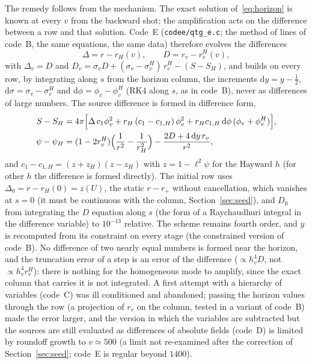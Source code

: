 \documentclass[11pt]{article}
\begin{document}
The remedy follows from the mechanism. The exact solution of~\eqref{eq:horizon} is known at every $v$ from the backward shot; the amplification acts on the difference between a row and that solution. Code~E (\texttt{codee/qtg\_e.c}; the method of lines of code~B, the same equations, the same data) therefore evolves the differences
\begin{equation}
\Delta=r-r_H(v),\qquad D=r_v-r_v^{H}(v),
\label{eq:vardiff}
\end{equation}
with $\Delta_v=D$ and $D_v=\sigma_vD+(\sigma_v-\sigma_v^{H})\,r_v^{H}-(S-S_H)$, and builds on every row, by integrating along $s$ from the horizon column, the increments $\mathrm{d}y=y-\tfrac12$, $\mathrm{d}\sigma=\sigma_v-\sigma_v^{H}$ and $\mathrm{d}\phi=\phi_v-\phi_v^{H}$ (RK4 along $s$, as in code~B), never as differences of large numbers. The source difference is formed in difference form,
\begin{align}
S-S_H&=4\pi\Bigl[\Delta\,c_1\phi_v^{2}+r_H\,(c_1-c_{1,H})\,\phi_v^{2}+r_Hc_{1,H}\,\mathrm{d}\phi\,(\phi_v+\phi_v^{H})\Bigr],\nonumber\\
\psi-\psi_H&=(1-2r_v^{H})\Bigl(\frac1{r^{2}}-\frac1{r_H^{2}}\Bigr)-\frac{2D+4\,\mathrm{d}y\,r_v}{r^{2}},
\label{eq:srcdiff}
\end{align}
and $c_1-c_{1,H}=(z+z_H)(z-z_H)$ with $z=1-\ell^{2}\psi$ for the Hayward $h$ (for other $h$ the difference is formed directly). The initial row uses $\Delta_0=r-r_H(0)=z(U)$, the static $r-r_+$ without cancellation, which vanishes at $s=0$ (it must be continuous with the column, Section~\ref{sec:seed}), and $D_0$ from integrating the $D$ equation along $s$ (the form of a Raychaudhuri integral in the difference variable) to $10^{-13}$ relative. The scheme remains fourth order, and $y$ is recomputed from its constraint on every stage (the constrained version of code~B). No difference of two nearly equal numbers is formed near the horizon, and the truncation error of a step is an error of the difference ($\propto h_v^{4}D$, not $\propto h_v^{4}r_v^{H}$): there is nothing for the homogeneous mode to amplify, since the exact column that carries it is not integrated. A first attempt with a hierarchy of variables (code~C) was ill conditioned and abandoned; passing the horizon values through the row (a projection of $r_v$ on the column, tested in a variant of code~B) made the error larger, and the version in which the variables are subtracted but the sources are still evaluated as differences of absolute fields (code~D) is limited by roundoff growth to $v\simeq500$ (a limit not re-examined after the correction of Section~\ref{sec:seed}; code~E is regular beyond $1400$).
\end{document}
